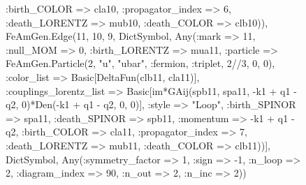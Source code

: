 \documentclass{revtex4}
\begin{document}
\begin{figure}[!htb]
\begin{center}
{:birth_COLOR => cla10, :propagator_index => 6, :death_LORENTZ => mub10, :death_COLOR => clb10)), FeAmGen.Edge(11, 10, 9, Dict{Symbol, Any}(:mark => 11, :null_MOM => 0, :birth_LORENTZ => mua11, :particle => FeAmGen.Particle(2, "u", "ubar", :fermion, :triplet, 2//3, 0, 0), :color_list => Basic[DeltaFun(clb11, cla11)], :couplings_lorentz_list => Basic[im*GAij(spb11, spa11, -k1 + q1 - q2, 0)*Den(-k1 + q1 - q2, 0, 0)], :style => "Loop", :birth_SPINOR => spa11, :death_SPINOR => spb11, :momentum => -k1 + q1 - q2, :birth_COLOR => cla11, :propagator_index => 7, :death_LORENTZ => mub11, :death_COLOR => clb11))], Dict{Symbol, Any}(:symmetry_factor => 1, :sign => -1, :n_loop => 2, :diagram_index => 90, :n_out => 2, :n_inc => 2)) 
}
\end{center}
\end{figure}
\end{document}
